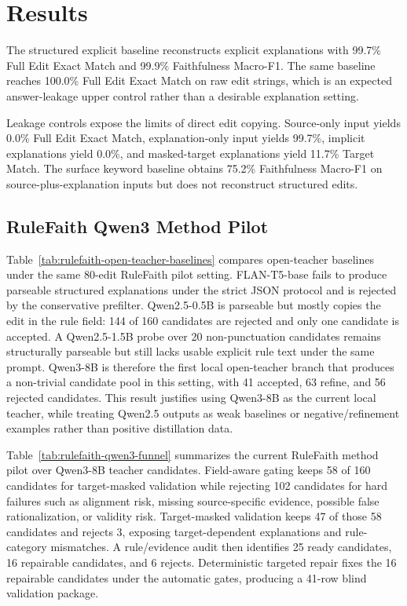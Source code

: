 \section{Results}




The structured explicit baseline reconstructs explicit explanations with 99.7\% Full Edit Exact Match and 99.9\% Faithfulness Macro-F1. The same baseline reaches 100.0\% Full Edit Exact Match on raw edit strings, which is an expected answer-leakage upper control rather than a desirable explanation setting.

Leakage controls expose the limits of direct edit copying. Source-only input yields 0.0\% Full Edit Exact Match, explanation-only input yields 99.7\%, implicit explanations yield 0.0\%, and masked-target explanations yield 11.7\% Target Match. The surface keyword baseline obtains 75.2\% Faithfulness Macro-F1 on source-plus-explanation inputs but does not reconstruct structured edits.

\subsection{RuleFaith Qwen3 Method Pilot}



Table~\ref{tab:rulefaith-open-teacher-baselines} compares open-teacher baselines under the same 80-edit RuleFaith pilot setting. FLAN-T5-base fails to produce parseable structured explanations under the strict JSON protocol and is rejected by the conservative prefilter. Qwen2.5-0.5B is parseable but mostly copies the edit in the rule field: 144 of 160 candidates are rejected and only one candidate is accepted. A Qwen2.5-1.5B probe over 20 non-punctuation candidates remains structurally parseable but still lacks usable explicit rule text under the same prompt. Qwen3-8B is therefore the first local open-teacher branch that produces a non-trivial candidate pool in this setting, with 41 accepted, 63 refine, and 56 rejected candidates. This result justifies using Qwen3-8B as the current local teacher, while treating Qwen2.5 outputs as weak baselines or negative/refinement examples rather than positive distillation data.



Table~\ref{tab:rulefaith-qwen3-funnel} summarizes the current RuleFaith method pilot over Qwen3-8B teacher candidates. Field-aware gating keeps 58 of 160 candidates for target-masked validation while rejecting 102 candidates for hard failures such as alignment risk, missing source-specific evidence, possible false rationalization, or validity risk. Target-masked validation keeps 47 of those 58 candidates and rejects 3, exposing target-dependent explanations and rule-category mismatches. A rule/evidence audit then identifies 25 ready candidates, 16 repairable candidates, and 6 rejects. Deterministic targeted repair fixes the 16 repairable candidates under the automatic gates, producing a 41-row blind validation package.

